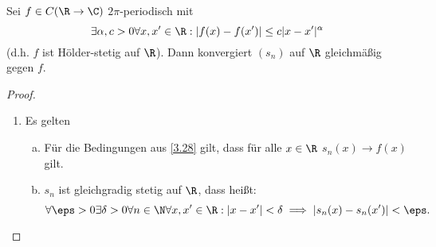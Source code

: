 \begin{st} \label{3.30}
	Sei $f \in C(\R \to \C)$ $2\pi$-periodisch mit
	\[
		\exists \alpha, c > 0 \forall x, x' \in \R : |f(x) - f(x')| \le c | x -x'|^\alpha
	\]
	(d.h. $f$ ist Hölder-stetig auf $\R$).
	Dann konvergiert $(s_n)$ auf $\R$ gleichmäßig gegen $f$.
	\begin{proof}
		\begin{enumerate}[1)]
			\item
				Es gelten
				\begin{enumerate}[a)]
					\item
						Für die Bedingungen aus \ref{3.28} gilt, dass für alle $x\in \R$ $ s_n(x) \to f(x)$ gilt.
					\item
						$s_n$ ist gleichgradig stetig auf $\R$, dass heißt:
						\[
							\forall \eps > 0 \exists \delta > 0 \forall n \in \N \forall x,x' \in \R : |x-x'|< \delta \implies |s_n(x)-s_n(x')| < \eps.
						\]


\end{enumerate}
\end{enumerate}
\end{proof}
\end{st}
